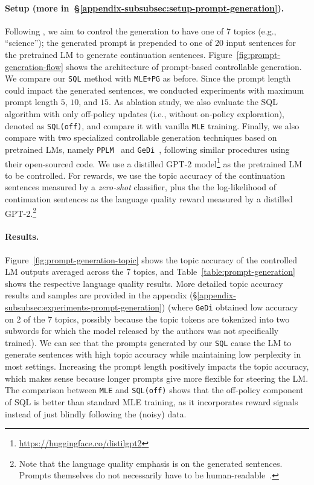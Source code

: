 \paragraph{Setup (more in~\S\ref{appendix-subsubsec:setup-prompt-generation}).}
Following \citep{dathathri2019plug}, we aim to control the generation to have one of 7 topics (e.g., ``science''); the generated prompt is prepended to one of 20 input sentences for the pretrained LM to generate continuation sentences. Figure~\ref{fig:prompt-generation-flow} shows the architecture of prompt-based controllable generation. We compare our \texttt{SQL} method with \texttt{MLE+PG} as before. Since the prompt length could impact the generated sentences, we conducted experiments with maximum prompt length $5$, $10$, and $15$. As ablation study, we also evaluate the SQL algorithm with only off-policy updates (i.e., without on-policy exploration), denoted as \texttt{SQL(off)}, and compare it with vanilla \texttt{MLE} training. Finally, we also compare with two specialized controllable generation techniques based on pretrained LMs, namely \texttt{PPLM}~\citep{dathathri2019plug} and \texttt{GeDi}~\citep{krause2020gedi}, following similar procedures using their open-sourced code. We use a distilled GPT-2 model\footnote{\url{https://huggingface.co/distilgpt2}} as the pretrained LM to be controlled. %
For rewards, we use the topic accuracy of the continuation sentences measured by a \emph{zero-shot} classifier, plus the the log-likelihood of continuation sentences as the language quality reward measured by a distilled GPT-2.\footnote{Note that the language quality emphasis is on the generated sentences. Prompts themselves do not necessarily have to be human-readable~\cite{wallace2019universal,sheng2020towards}.}


\paragraph{Results.}

Figure~\ref{fig:prompt-generation-topic} shows the topic accuracy of the controlled LM outputs averaged across the 7 topics, and Table~\ref{table:prompt-generation} shows the respective language quality results. More detailed topic accuracy results and samples are provided in the appendix (\S\ref{appendix-subsubsec:experiments-prompt-generation}) (where \texttt{GeDi} obtained low accuracy on 2 of the 7 topics, possibly because the topic tokens are tokenized into two subwords for which the model released by the authors was not specifically trained). 
We can see that the prompts generated by our \texttt{SQL} cause the LM to generate sentences with high topic accuracy while maintaining low perplexity in most settings.
Increasing the prompt length positively impacts the topic accuracy, which makes sense because longer prompts give more flexible for steering the LM.
The comparison between \texttt{MLE} and \texttt{SQL(off)}
shows that the off-policy component of SQL is better than standard MLE training, as it incorporates reward signals instead of just blindly following the (noisy) data. 

